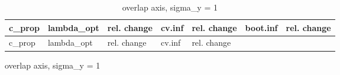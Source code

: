 \documentclass[
  letterpaper,
  DIV=11,
  numbers=noendperiod]{scrartcl}
\begin{document}
\begin{figure}
\begin{minipage}[t]{0.50\linewidth}
\begin{longtable}[]{@{}
  >{\raggedleft\arraybackslash}p{}
  >{\raggedleft\arraybackslash}p{}
  >{\raggedleft\arraybackslash}p{}
  >{\raggedleft\arraybackslash}p{}
  >{\raggedleft\arraybackslash}p{}
  >{\raggedleft\arraybackslash}p{}
  >{\raggedleft\arraybackslash}p{}@{}}
\caption{overlap axis, sigma\_y = 1}\tabularnewline
\toprule\noalign{}
\begin{minipage}[b]{\linewidth}\raggedleft
c\_prop
\end{minipage} & \begin{minipage}[b]{\linewidth}\raggedleft
lambda\_opt
\end{minipage} & \begin{minipage}[b]{\linewidth}\raggedleft
rel. change
\end{minipage} & \begin{minipage}[b]{\linewidth}\raggedleft
cv.inf
\end{minipage} & \begin{minipage}[b]{\linewidth}\raggedleft
rel. change
\end{minipage} & \begin{minipage}[b]{\linewidth}\raggedleft
boot.inf
\end{minipage} & \begin{minipage}[b]{\linewidth}\raggedleft
rel. change
\end{minipage} \\
\midrule\noalign{}
\endfirsthead
\toprule\noalign{}
\begin{minipage}[b]{\linewidth}\raggedleft
c\_prop
\end{minipage} & \begin{minipage}[b]{\linewidth}\raggedleft
lambda\_opt
\end{minipage} & \begin{minipage}[b]{\linewidth}\raggedleft
rel. change
\end{minipage} & \begin{minipage}[b]{\linewidth}\raggedleft
cv.inf
\end{minipage} & \begin{minipage}[b]{\linewidth}\raggedleft
rel. change
\end{minipage} & \begin{minipage}[b]{\linewidth}\raggedleft

\end{minipage}
\end{longtable}
\end{minipage}
\end{figure}
\end{document}
